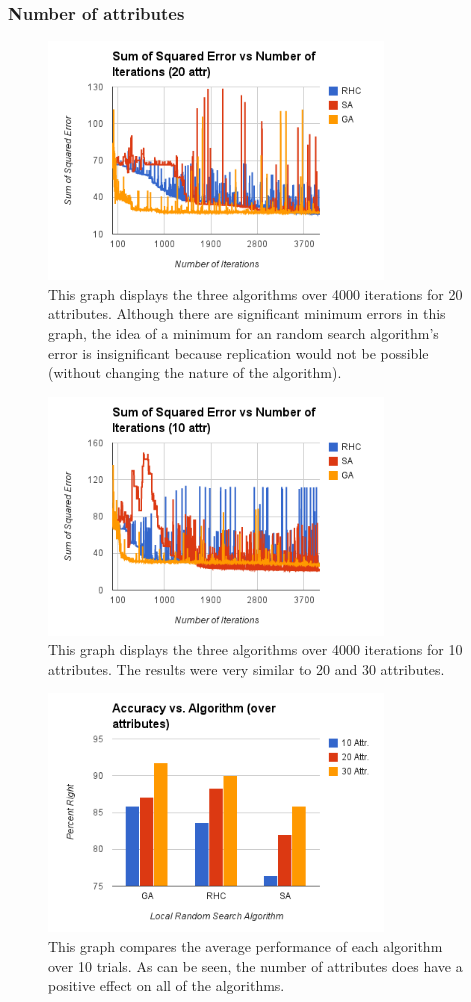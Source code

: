 \documentclass[annual]{acmsiggraph}
\begin{document}
\subsubsection{Number of attributes}
\begin{figure}[ht]
  \centering
  \includegraphics[width=3.5in]{charts/g2_error_vs_iteration_for_rhc_sa_ga_20_attr.png}
  \caption{This graph displays the three algorithms over 4000 iterations for 20 attributes. Although there are significant
  minimum errors in this graph, the idea of a minimum for an random search algorithm's error is insignificant because replication would not be possible (without changing the nature of the algorithm). }
  \label{fig:g2}
\end{figure}
\begin{figure}[ht]
  \centering
  \includegraphics[width=3.5in]{charts/g3_error_vs_iteration_for_rhc_sa_ga_10_attr.png}
  \caption{This graph displays the three algorithms over 4000 iterations for 10 attributes. The results were very similar to 20 and 30 attributes.}
  \label{fig:g3}
\end{figure}
\begin{figure}[ht]
  \centering
  \includegraphics[width=3.5in]{charts/g4_accuracy_vs_algo_rhc_sa_ga.png}
  \caption{This graph compares the average performance of each algorithm over 10 trials. As can be seen, the
  number of attributes does have a positive effect on all of the algorithms.}
  \label{fig:g4}
\end{figure}
\end{document}
